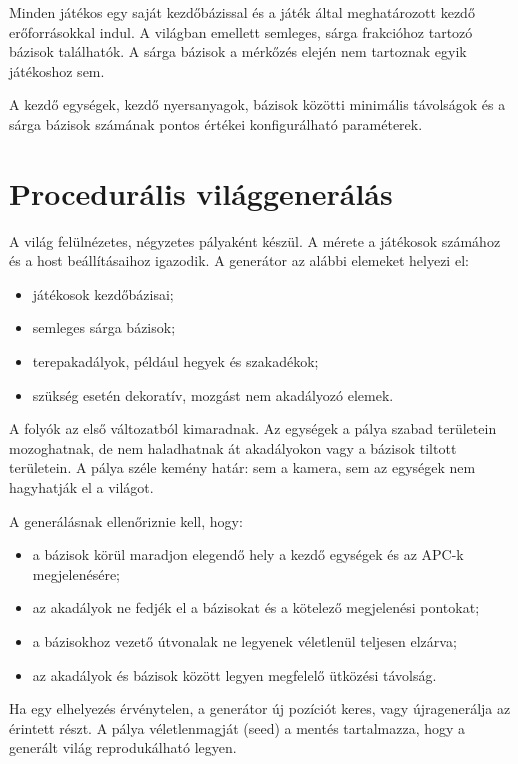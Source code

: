 \documentclass[12pt,a4paper]{article}
\begin{document}
Minden játékos egy saját kezdőbázissal és a játék által meghatározott kezdő erőforrásokkal indul. A világban emellett semleges, sárga frakcióhoz tartozó bázisok találhatók. A sárga bázisok a mérkőzés elején nem tartoznak egyik játékoshoz sem.

A kezdő egységek, kezdő nyersanyagok, bázisok közötti minimális távolságok és a sárga bázisok számának pontos értékei konfigurálható paraméterek.

\section{Procedurális világgenerálás}

A világ felülnézetes, négyzetes pályaként készül. A mérete a játékosok számához és a host beállításaihoz igazodik. A generátor az alábbi elemeket helyezi el:

\begin{itemize}
  \item játékosok kezdőbázisai;
  \item semleges sárga bázisok;
  \item terepakadályok, például hegyek és szakadékok;
  \item szükség esetén dekoratív, mozgást nem akadályozó elemek.
\end{itemize}

A folyók az első változatból kimaradnak. Az egységek a pálya szabad területein mozoghatnak, de nem haladhatnak át akadályokon vagy a bázisok tiltott területein. A pálya széle kemény határ: sem a kamera, sem az egységek nem hagyhatják el a világot.

A generálásnak ellenőriznie kell, hogy:
\begin{itemize}
  \item a bázisok körül maradjon elegendő hely a kezdő egységek és az APC-k megjelenésére;
  \item az akadályok ne fedjék el a bázisokat és a kötelező megjelenési pontokat;
  \item a bázisokhoz vezető útvonalak ne legyenek véletlenül teljesen elzárva;
  \item az akadályok és bázisok között legyen megfelelő ütközési távolság.
\end{itemize}

Ha egy elhelyezés érvénytelen, a generátor új pozíciót keres, vagy újragenerálja az érintett részt. A pálya véletlenmagját (seed) a mentés tartalmazza, hogy a generált világ reprodukálható legyen.
\end{document}
